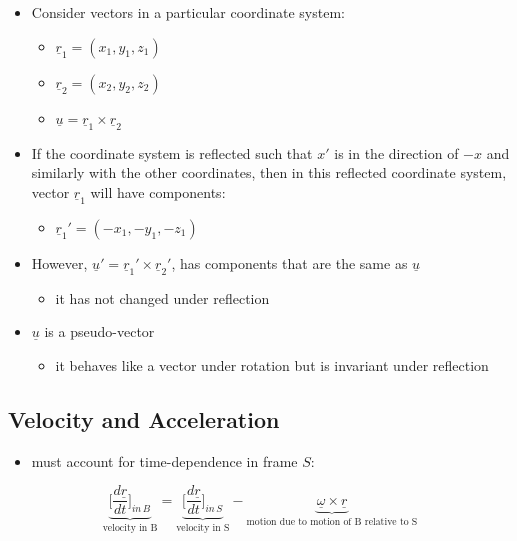 \documentclass[a4paper,11pt,normalem]{article}
\begin{document}
\begin{example}

\begin{itemize}
\item
  Consider vectors in a particular coordinate system:
  \begin{itemize}
  \item
    \(\underline{r}_1 = (x_1, y_1, z_1)\)
  \item
    \(\underline{r}_2 = (x_2, y_2, z_2)\)
  \item
    \(\underline{u} = \underline{r}_1 \times \underline{r}_2\)
  \end{itemize}
\item
  If the coordinate system is reflected such that \(x'\) is in the
  direction of \(-x\) and similarly with the other coordinates, then in
  this reflected coordinate system, vector \(\underline{r}_1\) will have
  components:
  \begin{itemize}
  \item
    \(\underline{r}_{1}' = (-x_1, -y_1, -z_1)\)
  \end{itemize}
\item
  However,
  \(\underline{u}' = \underline{r}_{1}' \times \underline{r}_{2}'\), has
  components that are the same as \(\underline{u}\)
  \begin{itemize}
  \item
    it has not changed under reflection
  \end{itemize}
\item
  \(\underline{u}\) is a pseudo-vector
  \begin{itemize}
  \item
    it behaves like a vector under rotation but is invariant under
    reflection
  \end{itemize}
\end{itemize}
\end{example}

\subsection{Velocity and Acceleration}\label{velocity-and-acceleration}

\begin{itemize}
\item
  must account for time-dependence in frame \(S\):
\end{itemize}

\[
    \underbrace{\Big[\frac{d\underline{r}}{dt}\Big]_{in\,B_{}}}_{\text{velocity in B}} = \underbrace{\Big[\frac{d\underline{r}}{dt}\Big]_{in\,S_{}}}_{\text{velocity in S}} - \underbrace{\underline{\omega} \times \underline{r}}_{\text{motion due to motion of B relative to S}}
\]
\end{document}

